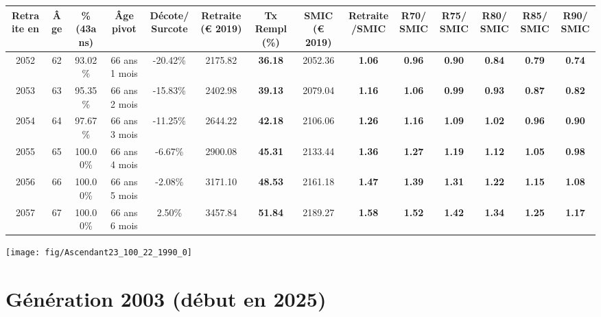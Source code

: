 \begin{adjustbox}{max width=\textwidth} 
\begin{tabular}[htb]{|c|c||c|c|c||c|c||c|c||c|c|c|c|c|} 
\hline 
 Retraite en &  Âge &  \%(43ans) &  Âge pivot &  Décote/Surcote &  Retraite (\euro{} 2019) &  Tx Rempl(\%) &  SMIC (\euro{} 2019) &  Retraite/SMIC &  R70/SMIC &  R75/SMIC &  R80/SMIC &  R85/SMIC &  R90/SMIC \\ 
\hline \hline 
 2052 &  62 &  93.02\% &  66 ans 1 mois &  -20.42\% &  2175.82 &  {\bf 36.18} &  2052.36 &  {\bf 1.06} &  {\bf {\color{red} 0.96}} &  {\bf {\color{red} 0.90}} &  {\bf {\color{red} 0.84}} &  {\bf {\color{red} 0.79}} &  {\bf {\color{red} 0.74}} \\ 
\hline 
 2053 &  63 &  95.35\% &  66 ans 2 mois &  -15.83\% &  2402.98 &  {\bf 39.13} &  2079.04 &  {\bf 1.16} &  {\bf 1.06} &  {\bf {\color{red} 0.99}} &  {\bf {\color{red} 0.93}} &  {\bf {\color{red} 0.87}} &  {\bf {\color{red} 0.82}} \\ 
\hline 
 2054 &  64 &  97.67\% &  66 ans 3 mois &  -11.25\% &  2644.22 &  {\bf 42.18} &  2106.06 &  {\bf 1.26} &  {\bf 1.16} &  {\bf 1.09} &  {\bf 1.02} &  {\bf {\color{red} 0.96}} &  {\bf {\color{red} 0.90}} \\ 
\hline 
 2055 &  65 &  100.00\% &  66 ans 4 mois &  -6.67\% &  2900.08 &  {\bf 45.31} &  2133.44 &  {\bf 1.36} &  {\bf 1.27} &  {\bf 1.19} &  {\bf 1.12} &  {\bf 1.05} &  {\bf {\color{red} 0.98}} \\ 
\hline 
 2056 &  66 &  100.00\% &  66 ans 5 mois &  -2.08\% &  3171.10 &  {\bf 48.53} &  2161.18 &  {\bf 1.47} &  {\bf 1.39} &  {\bf 1.31} &  {\bf 1.22} &  {\bf 1.15} &  {\bf 1.08} \\ 
\hline 
 2057 &  67 &  100.00\% &  66 ans 6 mois &  2.50\% &  3457.84 &  {\bf 51.84} &  2189.27 &  {\bf 1.58} &  {\bf 1.52} &  {\bf 1.42} &  {\bf 1.34} &  {\bf 1.25} &  {\bf 1.17} \\ 
\hline 
\hline 
\end{tabular} 
\end{adjustbox} 
 
 \vspace{0.1cm} 

 {\hspace{-2.2cm}\texttt{[image: fig/Ascendant23\_100\_22\_1990\_0]}} 

\newpage 
 
\section{Génération 2003 (début en 2025)\label{Ascendant23_100_22_2003_0}} 
 
